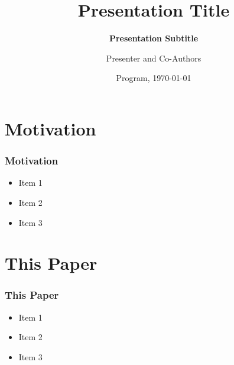 \documentclass[11pt]{beamer}
\begin{document}
	\title[Presentation Title]{\bfseries Presentation Title}
	\subtitle{\bfseries Presentation Subtitle}
	\author[Full Name]{Presenter and Co-Authors}

	
	\date[\today]{Program, \today}

	\begin{frame}[plain]
		\maketitle
		
	\end{frame}
	\setcounter{framenumber}{0}

\section{Motivation}
	\begin{frame}
		\frametitle{\bfseries Motivation}
		
		\begin{itemize}
			\item Item 1
			\item Item 2
			\item Item 3
		\end{itemize}
	\end{frame}

\section[]{This Paper}
	\begin{frame}
		\frametitle{\bfseries This Paper}
		
		\begin{itemize}
			\item Item 1
			\item Item 2
			\item Item 3
		\end{itemize}

	\end{frame}
\end{document}
